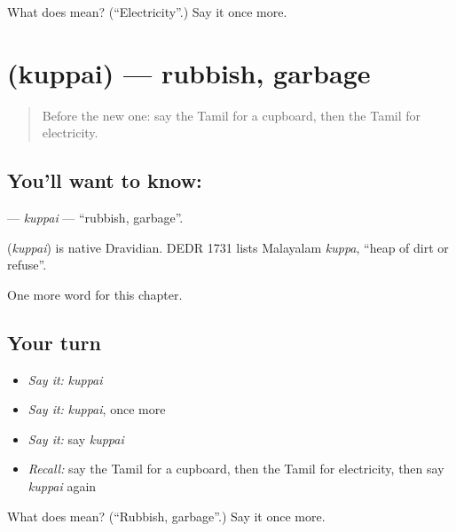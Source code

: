\begin{tcolorbox}[breakable,colback=teal!4,colframe=teal!35!black,title={Before you move on}]
What does  mean? (\textquotedblleft{}Electricity\textquotedblright{}.) Say it once more.
\end{tcolorbox}
\section[\texorpdfstring{\ta{குப்பை} (kuppai)}{குப்பை (kuppai)}]{ (kuppai) — rubbish, garbage}

\label{lesson:TA-C213-kuppai}



\begin{quote}
Before the new one: say the Tamil for a cupboard, then the Tamil for electricity.
\end{quote}

\subsection*{You'll want to know: }
\textbf{} — \emph{kuppai} — \textquotedblleft{}rubbish, garbage\textquotedblright{}.

\begin{cousinweb}
\textbf{} (\emph{kuppai}) is native Dravidian. DEDR 1731 lists Malayalam \emph{kuppa}, \textquotedblleft{}heap of dirt or refuse\textquotedblright{}.
\end{cousinweb}

\begin{grammarlens}[title={What you've built}]
One more word for this chapter.
\end{grammarlens}

\subsection*{Your turn}
\begin{itemize}
\raggedright
  \item \emph{Say it:} \emph{kuppai}
  \item \emph{Say it:} \emph{kuppai}, once more
  \item \emph{Say it:} say \emph{kuppai}
  \item \emph{Recall:} say the Tamil for a cupboard, then the Tamil for electricity, then say \emph{kuppai} again
\end{itemize}

\begin{tcolorbox}[breakable,colback=teal!4,colframe=teal!35!black,title={Before you move on}]
What does  mean? (\textquotedblleft{}Rubbish, garbage\textquotedblright{}.) Say it once more.
\end{tcolorbox}
